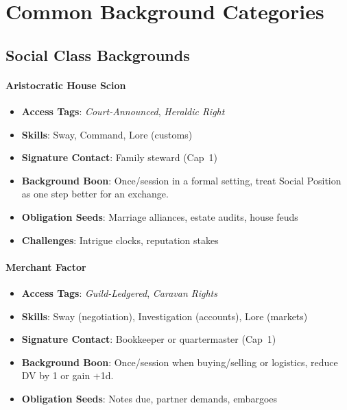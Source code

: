 \section{Common Background Categories}

\subsection*{Social Class Backgrounds}

\paragraph{Aristocratic House Scion}
\begin{itemize}
\item \textbf{Access Tags}: \textit{Court-Announced}, \textit{Heraldic Right}
\item \textbf{Skills}: Sway, Command, Lore (customs)
\item \textbf{Signature Contact}: Family steward (Cap~1)
\item \textbf{Background Boon}: Once/session in a formal setting, treat Social Position as one step better for an exchange.
\item \textbf{Obligation Seeds}: Marriage alliances, estate audits, house feuds
\item \textbf{Challenges}: Intrigue clocks, reputation stakes
\end{itemize}

\paragraph{Merchant Factor}
\begin{itemize}
\item \textbf{Access Tags}: \textit{Guild-Ledgered}, \textit{Caravan Rights}
\item \textbf{Skills}: Sway (negotiation), Investigation (accounts), Lore (markets)
\item \textbf{Signature Contact}: Bookkeeper or quartermaster (Cap~1)
\item \textbf{Background Boon}: Once/session when buying/selling or logistics, reduce DV by 1 or gain +1d.
\item \textbf{Obligation Seeds}: Notes due, partner demands, embargoes
\end{itemize}

